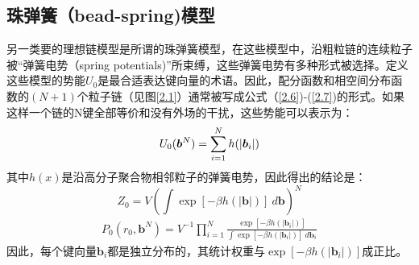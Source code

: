 \subsection{珠弹簧（bead-spring)模型}
\begin{center}
\author{hzj}
\end{center}


另一类要的理想链模型是所谓的珠弹簧模型，在这些模型中，沿粗粒链的连续粒子被“弹簧电势（spring potentials)”所束缚，这些弹簧电势有多种形式被选择。定义这些模型的势能$U_{0}$是最合适表达键向量的术语。因此，配分函数和相空间分布函数的$(N+1)$个粒子链（见图\ref{2.1}）通常被写成公式（\ref{2.6})-(\ref{2.7})的形式。如果这样一个链的N键全部等价和没有外场的干扰，这些势能可以表示为：
\begin{equation}\label{2.26}
\begin{split}
U_{0}(\bm{b}^{N})= \sum_{i=1}^{N}h(|\bm{b}_{i}|)
\end{split}
\end{equation}
其中$h(x)$是沿高分子聚合物相邻粒子的弹簧电势，因此得出的结论是：
\begin{equation}\label{2.27}
Z_{0}=V(\int \exp[-\beta h(|\mathbf{b}|)]~d\mathbf{b})^N 
\end{equation}
\begin{equation}\label{2.28}
\begin{split}		
P_{0} (r_{0},\mathbf{b}^N) =V^{-1} \prod_{i=1}^{N} \frac{\exp[-\beta h(|\mathbf{b}_{i}|)]}{\int \exp[-\beta h(|\mathbf{b}_{i}|)]~d \mathbf{b}_{i}}
\end{split}
\end{equation}
因此，每个键向量$\mathbf{b}_{i}$都是独立分布的，其统计权重与$\exp[-\beta h(|\mathbf{b}_{i}|)]$成正比。 

